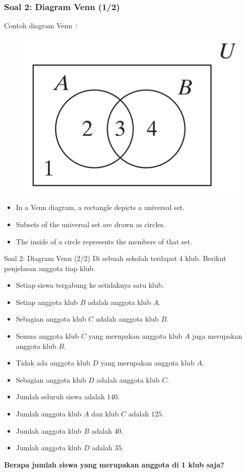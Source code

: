 \documentclass[english,t]{beamer}
\begin{document}
\begin{frame}
  \frametitle{Soal 2: Diagram Venn (1/2)} 
	Contoh diagram Venn~\citep{johnsonbaugh2009discrete}:
	\begin{figure}[!ht]
		\centering
		\includegraphics[scale=0.4]{images/diagram_venn}		
	\end{figure}
	\begin{itemize}
		\item<2-> In a Venn diagram, a rectangle depicts a universal set.
		\item<3-> Subsets of the universal set are drawn as circles.
		\item<4-> The inside of a circle represents the members of that set.
	\end{itemize}	
\end{frame}

\begin{frame}{Soal 2: Diagram Venn (2/2)}   
Di sebuah sekolah terdapat 4 klub. Berikut penjelasan anggota tiap klub.
\begin{itemize}
	\item Setiap siswa tergabung ke setidaknya satu klub.
	\item Setiap anggota klub $B$ adalah anggota klub $A$.
	\item Sebagian anggota klub $C$ adalah anggota klub $B$.
	\item Semua anggota klub $C$ yang merupakan anggota klub $A$ juga merupakan anggota klub $B$.
	\item Tidak ada anggota klub $D$ yang merupakan anggota klub $A$.
	\item Sebagian anggota klub $D$ adalah anggota klub $C$.
	\item Jumlah seluruh siswa adalah $140$.
	\item Jumlah anggota klub $A$ dan klub $C$ adalah $125$.
	\item Jumlah anggota klub $B$ adalah $40$.
	\item Jumlah anggota klub $D$ adalah $35$.
\end{itemize}
 \textbf{Berapa jumlah siswa yang merupakan anggota di 1 klub saja?}
\end{frame}
\end{document}
